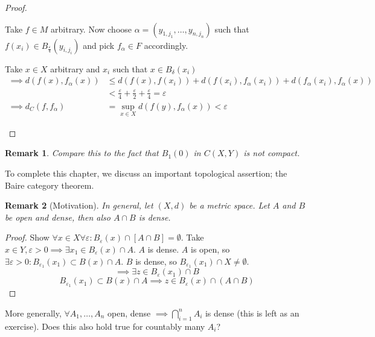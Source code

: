 \documentclass{article}
\numberwithin{lecref}{section}
\newtheorem*{Remark}{Remark}
\begin{document}
\begin{proof}
\begin{enumerate}
\begin{description}
					Take $f \in M$ arbitrary. Now choose $\alpha = (y_{1,j_1}, \dots, y_{n,j_n})$ such that $f(x_i) \in B_{\frac\varepsilon4}(y_{i,j_i})$ and pick $f_\alpha \in F$ accordingly.

					Take $x \in X$ arbitrary and $x_i$ such that $x \in B_\delta(x_i)$
					\begin{align*}
						\implies d(f(x), f_\alpha(x)) &\leq d(f(x), f(x_i)) + d(f(x_i), f_\alpha(x_i)) + d(f_\alpha(x_i), f_\alpha(x)) \\
							&< \frac\varepsilon4 + \frac\varepsilon2 + \frac\varepsilon4 = \varepsilon \\
						\implies d_C(f, f_\alpha) &= \sup_{x \in X} d(f(y), f_\alpha(x)) < \varepsilon
					\end{align*}
			\end{description}
	\end{enumerate}
\end{proof}

\begin{Remark}
	Compare this to the fact that $B_1(0)$ in $C(X, Y)$ is \emph{not} compact.
\end{Remark}

To complete this chapter, we discuss an important topological assertion; the Baire category theorem.

\begin{Remark}[Motivation]
	In general, let $(X, d)$ be a metric space. Let $A$ and $B$ be open and dense, then also $A \cap B$ is dense.
\end{Remark}

\begin{proof}
	Show $\forall x \in X \forall \varepsilon: B_\varepsilon(x) \cap [A \cap B] = \emptyset$.
	Take $x \in Y, \varepsilon > 0 \implies \exists x_1 \in B_{\varepsilon}(x) \cap A$. $A$ is dense.
	$A$ is open, so $\exists \varepsilon > 0: B_{\varepsilon_1}(x_1) \subset B(x) \cap A$.
	$B$ is dense, so $B_{\varepsilon_1}(x_1) \cap X \neq \emptyset$.
	\[ \implies \exists z \in B_{\varepsilon}(x_1) \cap B \]
	\[ B_{\varepsilon_1}(x_1) \subset B(x) \cap A \implies z \in B_\varepsilon(x) \cap (A \cap B) \]
\end{proof}

More generally, $\forall A_1, \dots, A_n$ open, dense $\implies \bigcap_{i=1}^n A_i$ is dense (this is left as an exercise).
Does this also hold true for countably many $A_i$?
\end{document}
